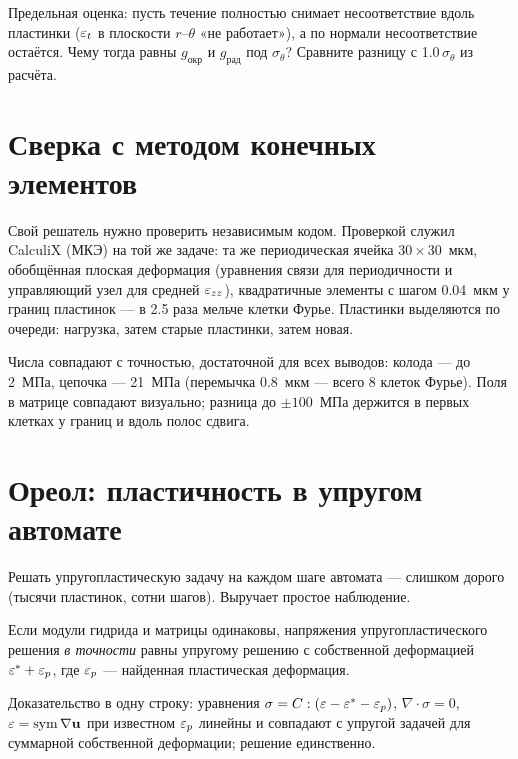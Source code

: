 \begin{exercise}
Предельная оценка: пусть течение полностью снимает несоответствие вдоль пластинки ($\varepsilon_t$ в
плоскости $r$--$\theta$ «не работает»), а по нормали несоответствие остаётся. Чему тогда равны
$g_{\text{окр}}$ и $g_{\text{рад}}$ под $\sigma_\theta$? Сравните разницу с 1.0$\,\sigma_\theta$ из
расчёта.
\end{exercise}

\section{Сверка с методом конечных элементов}

Свой решатель нужно проверить независимым кодом. Проверкой служил CalculiX (МКЭ) на той же
задаче: та же периодическая ячейка $30\times30$~мкм, обобщённая плоская деформация (уравнения
связи для периодичности и управляющий узел для средней $\varepsilon_{zz}$), квадратичные элементы с
шагом 0.04~мкм у границ пластинок --- в 2.5 раза мельче клетки Фурье. Пластинки выделяются по
очереди: нагрузка, затем старые пластинки, затем новая.


Числа совпадают с точностью, достаточной для всех выводов: колода --- до 2~МПа, цепочка --- 21~МПа
(перемычка 0.8~мкм --- всего 8 клеток Фурье). Поля в матрице совпадают визуально; разница до
$\pm100$~МПа держится в первых клетках у границ и вдоль полос сдвига.

\section{Ореол: пластичность в упругом автомате}

Решать упругопластическую задачу на каждом шаге автомата --- слишком дорого (тысячи пластинок,
сотни шагов). Выручает простое наблюдение.

\begin{keyf}
Если модули гидрида и матрицы одинаковы, напряжения упругопластического решения \emph{в точности}
равны упругому решению с собственной деформацией $\varepsilon^*+\varepsilon_p$, где $\varepsilon_p$ --- найденная
пластическая деформация.
\end{keyf}
Доказательство в одну строку: уравнения $\sigma=C:(\varepsilon-\varepsilon^*-\varepsilon_p)$, $\nabla\cdot\sigma=0$,
$\varepsilon=\operatorname{sym}\nabla\mathbf u$ при известном $\varepsilon_p$ линейны и совпадают с упругой
задачей для суммарной собственной деформации; решение единственно.


